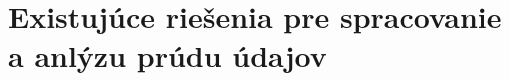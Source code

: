 %

\chapter{Existujúce riešenia pre spracovanie a anlýzu prúdu údajov}
\label{Existing solutions of data stream analysis} 

